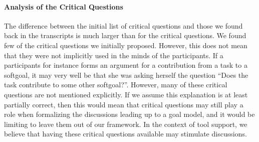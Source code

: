 \paragraph{Analysis of the Critical Questions} The difference between the initial list of critical questions and those we found back in the transcripts is much larger than for the critical questions. %
We found few of the critical questions we initially proposed. However, this does not mean that they were not implicitly used in the minds of the participants. If a participants for instance forms an argument for a contribution from a task to a softgoal, it may very well be that she was asking herself the question ``Does the task contribute to some other softgoal?''. However, many of these critical questions are not mentioned explicitly. If we assume this explanation is at least partially correct, then this would mean that critical questions may still play a role when formalizing the discussions leading up to a goal model, and it would be limiting to leave them out of our framework. In the context of tool support, we believe that having these critical questions available may stimulate discussions.